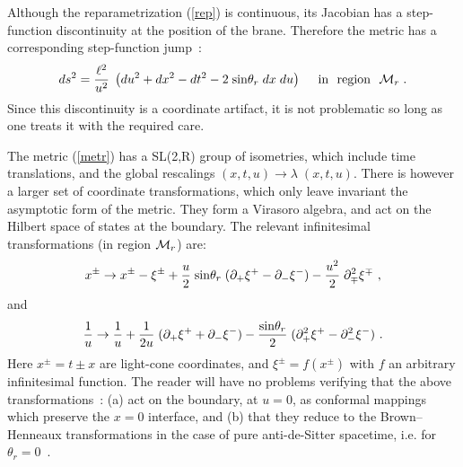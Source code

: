 \documentclass[a4paper,12pt,oneside]{article}
\begin{document}
Although the reparametrization (\ref{rep})  is continuous,  
its Jacobian has a step-function discontinuity at the position of
the brane. Therefore the metric has a corresponding 
step-function jump~:  
\begin{equation}
ds^2 = {\ell^2\over u^2}\; \left( du^2 +dx^2 -dt^2
  -2 \;  {\rm sin}\theta_{r}\; dx\; du \right) \    \ 
\ \ {\rm in\ \  region}\ \  {\cal M}_r\; . 
\label{metr}
\end{equation}
\vskip 0.15cm 
\noindent 
Since this discontinuity is a coordinate artifact,  it is not problematic
so long as one treats it with the required  care. 


 The metric (\ref{metr}) has a SL(2,R) group of  isometries, 
which include  time translations, and  the 
global rescalings $(x,t,u)\to \lambda\; (x,t,u)$.  
There is however a larger set of coordinate transformations, which
only leave invariant the asymptotic form of the metric. 
They form a Virasoro algebra, and act on the 
Hilbert  space of states  at the boundary.  
The relevant infinitesimal transformations (in region ${\cal M}_r$) are:
\begin{equation}
 x^\pm \rightarrow x^\pm - \xi^\pm +
 { u\over 2}\; {\rm sin}\theta_r\;
 ( \partial_+\xi^+ - \partial_-\xi^-)
- { u^2\over 2} \; \partial_{\mp}^2 \xi^{\mp}\ , 
\label{j1}
\end{equation}
and
\begin{equation}
 {1\over u}  \rightarrow {1\over u} + {1\over 2u}\;
(\partial_+\xi^+ + \partial_-\xi^-) - { {\rm sin}\theta_r\over 2}\;
(\partial_+^2\xi^+ -\partial_-^2\xi^-)\ .
\label{j2}
\end{equation}
\vskip 0.15cm \noindent  Here $x^\pm = t\pm x$
are light-cone coordinates, and $\xi^\pm = f(x^\pm)$ 
with $f$ an arbitrary  infinitesimal  function. 
The reader will have no problems  verifying that the above  transformations~:
(a)  act on the boundary, at $u=0$,  as  conformal mappings
which  preserve  the $x=0$ interface, 
and (b) that they reduce 
to the Brown--Henneaux transformations \cite{BH} 
in the case of  pure anti-de-Sitter spacetime,
 i.e. for $\theta_r=0$~. 
\end{document}
